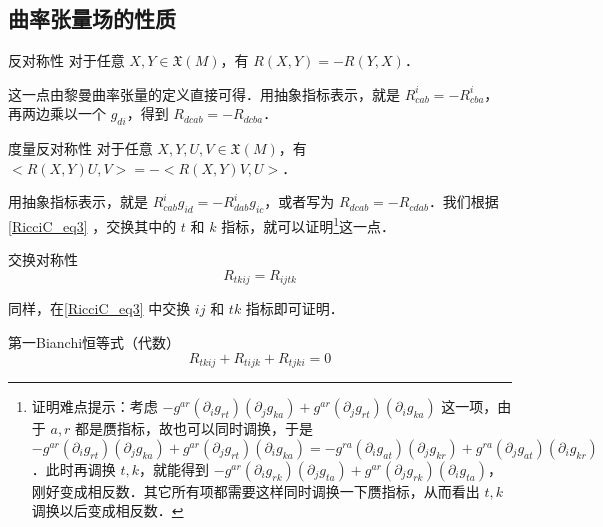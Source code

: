 








\subsection{曲率张量场的性质}

\begin{theorem}{反对称性}
对于任意 $X, Y\in\mathfrak{X}(M)$，有 $R(X, Y)=-R(Y, X)$．
\end{theorem}


这一点由黎曼曲率张量的定义直接可得．用抽象指标表示，就是 $R^i_{cab}=-R^i_{cba}$，再两边乘以一个 $g_{di}$，得到 $R_{dcab}=-R_{dcba}$．





\begin{theorem}{度量反对称性}
对于任意 $X, Y, U, V\in\mathfrak{X}(M)$，有 $<R(X, Y)U, V>=-<R(X, Y)V, U>$．


\end{theorem}

用抽象指标表示，就是 $R^i_{cab}g_{id}=-R^i_{dab}g_{ic}$，或者写为 $R_{dcab}=-R_{cdab}$．我们根据\autoref{RicciC_eq3}  ，交换其中的 $t$ 和 $k$ 指标，就可以证明\footnote{证明难点提示：考虑 $-g^{ar}(\partial_ig_{rt})(\partial_jg_{ka})+g^{ar}(\partial_jg_{rt})(\partial_ig_{ka})$ 这一项，由于 $a, r$ 都是赝指标，故也可以同时调换，于是 $-g^{ar}(\partial_ig_{rt})(\partial_jg_{ka})+g^{ar}(\partial_jg_{rt})(\partial_ig_{ka})=-g^{ra}(\partial_ig_{at})(\partial_jg_{kr})+g^{ra}(\partial_jg_{at})(\partial_ig_{kr})$．此时再调换 $t, k$，就能得到 $-g^{ar}(\partial_ig_{rk})(\partial_jg_{ta})+g^{ar}(\partial_jg_{rk})(\partial_ig_{ta})$，刚好变成相反数．其它所有项都需要这样同时调换一下赝指标，从而看出 $t, k$ 调换以后变成相反数．}这一点．

\begin{theorem}{交换对称性}\label{RicciC_the2}
\begin{equation}\label{RicciC_eq5}
R_{tkij}=R_{ijtk}
\end{equation}
\end{theorem}

同样，在\autoref{RicciC_eq3} 中交换 $ij$ 和 $tk$ 指标即可证明．

\begin{theorem}{第一Bianchi恒等式（代数）}
\begin{equation}\label{RicciC_eq4}
R_{tkij}+R_{tijk}+R_{tjki}=0
\end{equation}
\end{theorem}

